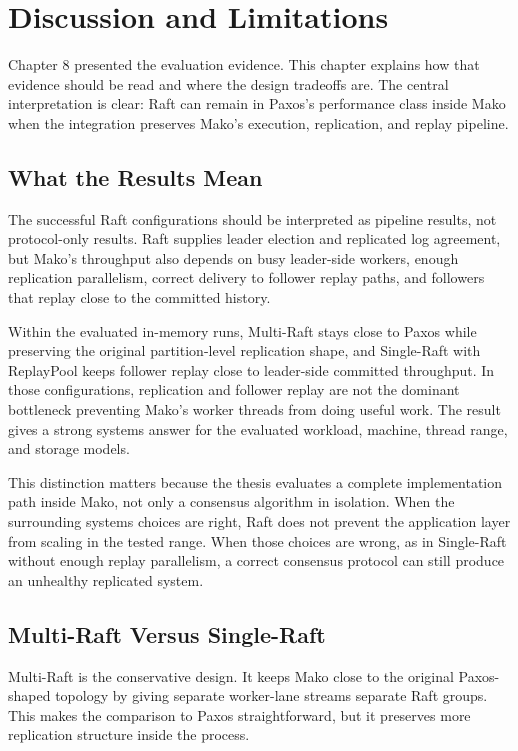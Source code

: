 \chapter{Discussion and Limitations}

Chapter 8 presented the evaluation evidence. This chapter explains how that
evidence should be read and where the design tradeoffs are. The central
interpretation is clear: Raft can remain in Paxos's performance class inside
Mako when the integration preserves Mako's execution, replication, and replay
pipeline.

\section{What the Results Mean}

The successful Raft configurations should be interpreted as pipeline results,
not protocol-only results. Raft supplies leader election and replicated log
agreement, but Mako's throughput also depends on busy leader-side workers,
enough replication parallelism, correct delivery to follower replay paths, and
followers that replay close to the committed history.

Within the evaluated in-memory runs, Multi-Raft stays close to Paxos while
preserving the original partition-level replication shape, and Single-Raft
with ReplayPool keeps follower replay close to leader-side committed
throughput. In those configurations, replication and follower replay are not
the dominant bottleneck preventing Mako's worker threads from doing useful
work. The result gives a strong systems answer for the evaluated workload,
machine, thread range, and storage models.

This distinction matters because the thesis evaluates a complete implementation
path inside Mako, not only a consensus algorithm in isolation. When the
surrounding systems choices are right, Raft does not prevent the application
layer from scaling in the tested range. When those choices are wrong, as in
Single-Raft without enough replay parallelism, a correct consensus protocol can
still produce an unhealthy replicated system.

\section{Multi-Raft Versus Single-Raft}

Multi-Raft is the conservative design. It keeps Mako close to the original
Paxos-shaped topology by giving separate worker-lane streams separate Raft
groups. This makes the comparison to Paxos straightforward, but it preserves
more replication structure inside the process.


